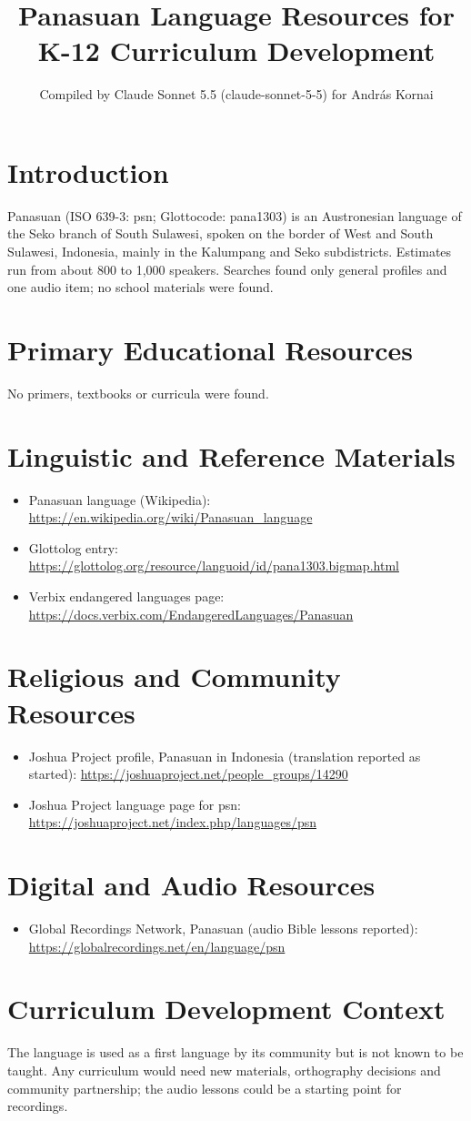 \documentclass[12pt]{article}
\title{Panasuan Language Resources for K-12 Curriculum Development}
\author{Compiled by Claude Sonnet 5.5 (claude-sonnet-5-5) for Andr\'as Kornai}
\date{}
\begin{document}
\maketitle

\section{Introduction}
Panasuan (ISO 639-3: psn; Glottocode: pana1303) is an Austronesian language of the Seko branch of South Sulawesi, spoken on the border of West and South Sulawesi, Indonesia, mainly in the Kalumpang and Seko subdistricts. Estimates run from about 800 to 1,000 speakers. Searches found only general profiles and one audio item; no school materials were found.

\section{Primary Educational Resources}
No primers, textbooks or curricula were found.

\section{Linguistic and Reference Materials}
\begin{itemize}
\item Panasuan language (Wikipedia): \url{https://en.wikipedia.org/wiki/Panasuan_language}
\item Glottolog entry: \url{https://glottolog.org/resource/languoid/id/pana1303.bigmap.html}
\item Verbix endangered languages page: \url{https://docs.verbix.com/EndangeredLanguages/Panasuan}
\end{itemize}

\section{Religious and Community Resources}
\begin{itemize}
\item Joshua Project profile, Panasuan in Indonesia (translation reported as started): \url{https://joshuaproject.net/people_groups/14290}
\item Joshua Project language page for psn: \url{https://joshuaproject.net/index.php/languages/psn}
\end{itemize}

\section{Digital and Audio Resources}
\begin{itemize}
\item Global Recordings Network, Panasuan (audio Bible lessons reported): \url{https://globalrecordings.net/en/language/psn}
\end{itemize}

\section{Curriculum Development Context}
The language is used as a first language by its community but is not known to be taught. Any curriculum would need new materials, orthography decisions and community partnership; the audio lessons could be a starting point for recordings.
\end{document}
